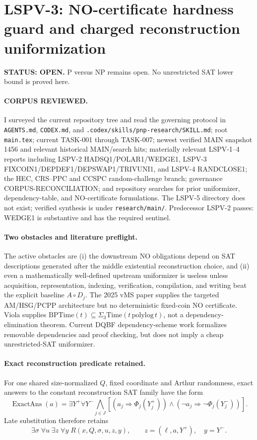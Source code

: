 \documentclass[11pt]{article}
\begin{document}
\section*{LSPV-3: NO-certificate hardness guard and charged reconstruction uniformization}
\textbf{STATUS: OPEN.} P versus NP remains open. No unrestricted SAT lower bound is proved here.

\paragraph{CORPUS REVIEWED.}
I surveyed the current repository tree and read the governing protocol in \texttt{AGENTS.md}, \texttt{CODEX.md}, and \texttt{.codex/skills/pnp-research/SKILL.md}; root \texttt{main.tex}; current TASK-001 through TASK-007; newest verified MAIN snapshot 1456 and relevant historical MAIN/search hits; materially relevant LSPV-1--4 reports including LSPV-2 HADSQ1/POLAR1/WEDGE1, LSPV-3 FIXCOIN1/DEPDEF1/DEPSWAP1/TRIVUNI1, and LSPV-4 RANDCLOSE1; the HEC, CRS--PPC and CCSPC random-challenge branch; governance CORPUS-RECONCILIATION; and repository searches for prior uniformizer, dependency-table, and NO-certificate formulations. The LSPV-5 directory does not exist; verified synthesis is under \texttt{research/main/}. Predecessor LSPV-2 passes: WEDGE1 is substantive and has the required sentinel.

\paragraph{Two obstacles and literature preflight.}
The active obstacles are (i) the downstream NO obligations depend on SAT descriptions generated after the middle existential reconstruction choice, and (ii) even a mathematically well-defined upstream uniformizer is useless unless acquisition, representation, indexing, verification, compilation, and writing beat the explicit baseline $A\circ D_j$. The 2025 vMS paper supplies the targeted AM/HSG/PCPP architecture but no deterministic fixed-coin NO certificate. Viola supplies $\mathrm{BPTime}(t)\subseteq\Sigma_3\mathrm{Time}(t\,\mathrm{polylog}\,t)$, not a dependency-elimination theorem. Current DQBF dependency-scheme work formalizes removable dependencies and proof checking, but does not imply a cheap unrestricted-SAT uniformizer.

\paragraph{Exact reconstruction predicate retained.}
For one shared size-normalized $Q$, fixed coordinate and Arthur randomness, exact answers to the constant reconstruction SAT family have the form
\[
\operatorname{ExactAns}(a)=\exists Y^+\forall Y^-\bigwedge_{j\in J}
\left[(a_j\Rightarrow\Phi_j(Y_j^+))\wedge(\neg a_j\Rightarrow\neg\Phi_j(Y_j^-))\right].
\]
Late substitution therefore retains
\[
\boxed{\exists\sigma\;\forall u\;\exists z\;\forall y\;R(x,Q,\sigma,u,z,y)},
\qquad z=(\ell,a,Y^+),\quad y=Y^-.
\]
\end{document}
